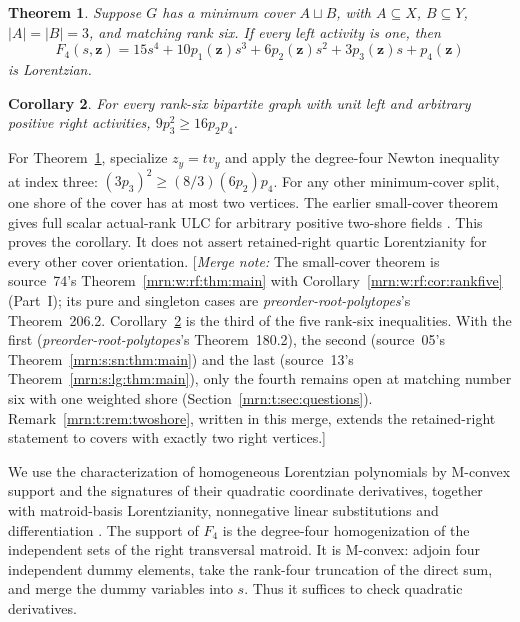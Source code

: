 \documentclass[11pt,a4paper]{article}
\newtheorem{theorem}{Theorem}[section]
\newtheorem{corollary}[theorem]{Corollary}
\theoremstyle{remark}\newtheorem{remark}[theorem]{Remark}
\newcommand{\mnote}[1]{[\textit{Merge note:} #1]}
\newcommand{\prp}{\emph{preorder-root-polytopes}}
\begin{document}
\begin{theorem}\label{mrn:t:tn:thm:quartic}
Suppose $G$ has a minimum cover $A\sqcup B$, with $A\subseteq X$,
$B\subseteq Y$, $|A|=|B|=3$, and matching rank six. If every left activity
is one, then
\begin{equation}\label{mrn:t:tn:eq:quartic}
 F_4(s,\mathbf z)=15s^4+10p_1(\mathbf z)s^3+
             6p_2(\mathbf z)s^2+3p_3(\mathbf z)s+p_4(\mathbf z)
\end{equation}
is Lorentzian.
\end{theorem}
\begin{corollary}\label{mrn:t:tn:cor:third}
For every rank-six bipartite graph with unit left and arbitrary positive
right activities, $9p_3^2\ge16p_2p_4$.
\end{corollary}
For Theorem~\ref{mrn:t:tn:thm:quartic}, specialize $z_y=t v_y$ and apply the
degree-four Newton inequality at index three:
$(3p_3)^2\ge(8/3)(6p_2)p_4$. For any other minimum-cover split, one shore of
the cover has at most two vertices. The earlier small-cover theorem gives
full scalar actual-rank ULC for arbitrary positive two-shore fields
\cite{b:m74}. This proves the corollary. It does not assert
retained-right quartic Lorentzianity for every other cover orientation.
\mnote{The small-cover theorem is source~74's Theorem~\ref{mrn:w:rf:thm:main}
with Corollary~\ref{mrn:w:rf:cor:rankfive} (Part~I); its pure and singleton
cases are \prp's Theorem~206.2. Corollary~\ref{mrn:t:tn:cor:third} is the third
of the five rank-six inequalities. With the first (\prp's Theorem~180.2), the
second (source~05's Theorem~\ref{mrn:s:sn:thm:main}) and the last (source~13's
Theorem~\ref{mrn:s:lg:thm:main}), only the fourth remains open at matching
number six with one weighted shore (Section~\ref{mrn:t:sec:questions}).
Remark~\ref{mrn:t:rem:twoshore}, written in this merge, extends the
retained-right statement to covers with exactly two right vertices.}

We use the characterization of homogeneous Lorentzian polynomials by
M-convex support and the signatures of their quadratic coordinate
derivatives, together with matroid-basis Lorentzianity, nonnegative linear
substitutions and differentiation \cite{b:BH}. The support of $F_4$ is the
degree-four homogenization of the independent sets of the right
transversal matroid. It is M-convex: adjoin four independent dummy elements,
take the rank-four truncation of the direct sum, and merge the dummy
variables into $s$. Thus it suffices to check quadratic derivatives.
\end{document}
